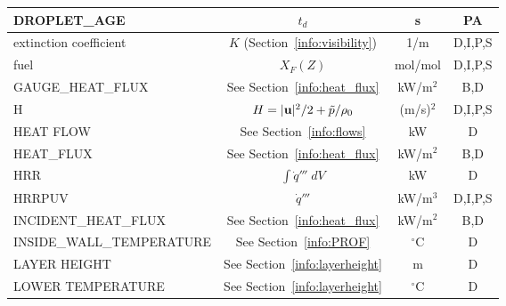 \documentclass[11pt]{book}
\newcommand{\bu}{{\bf u}}
\newcommand{\tp}{\tilde{p}}
\newcommand{\dq}{\dot{q}}
\begin{document}
\begin{table}[h!]
\begin{center}
\begin{tabular}{|l|c|c|c|}
{\ct DROPLET\_AGE}                              & $t_d$                                         & s              & PA           \\ \hline
{\ct extinction coefficient}                    & $K$ (Section~\ref{info:visibility})           & 1/m            & D,I,P,S      \\ \hline
{\ct fuel}                                      & $X_F(Z)$                                      & mol/mol        & D,I,P,S      \\ \hline
{\ct GAUGE\_HEAT\_FLUX}                         & See Section~\ref{info:heat_flux}              & kW/m$^2$       & B,D          \\ \hline
{\ct H}                                         & $H=|\bu|^2/2 + \tp/\rho_0$                    & (m/s)$^2$      & D,I,P,S      \\ \hline
{\ct HEAT FLOW}                                 & See Section~\ref{info:flows}                  & kW             & D            \\ \hline
{\ct HEAT\_FLUX}                                & See Section~\ref{info:heat_flux}              & kW/m$^2$       & B,D          \\ \hline
{\ct HRR}                                       & $\int \dq''' \; dV$                           & kW             & D            \\ \hline
{\ct HRRPUV}                                    & $\dq'''$                                      & kW/m$^3$       & D,I,P,S      \\ \hline
{\ct INCIDENT\_HEAT\_FLUX}                      & See Section~\ref{info:heat_flux}              & kW/m$^2$       & B,D          \\ \hline
{\ct INSIDE\_WALL\_TEMPERATURE}                 & See Section~\ref{info:PROF}                   & $^\circ$C      & D            \\ \hline
{\ct LAYER HEIGHT}                              & See Section~\ref{info:layerheight}            & m              & D            \\ \hline
{\ct LOWER TEMPERATURE}                         & See Section~\ref{info:layerheight}            & $^\circ$C      & D            \\ \hline
\end{tabular}
\label{tab:output}
\end{center}
\end{table}
\end{document}
